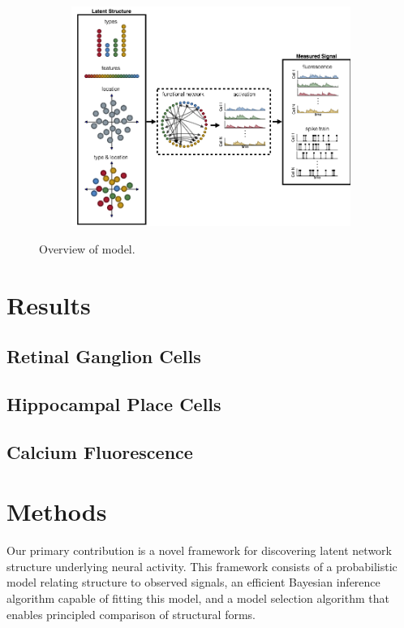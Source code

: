 \begin{figure}[t]
  \centering
  \begin{subfigure}[b]{\textwidth}
    \centering
    \includegraphics[width=\textwidth]{figures/ch3/figure1.png}
  \end{subfigure}
  \caption{Overview of model.}
  \label{fig:fig1}
\end{figure}

\section{Results}

\subsection{Retinal Ganglion Cells}

\subsection{Hippocampal Place Cells}

\subsection{Calcium Fluorescence}

\section{Methods}
Our primary contribution is a novel framework for discovering latent
network structure underlying neural activity.  This framework consists
of a probabilistic model relating structure to observed signals, an
efficient Bayesian inference algorithm capable of fitting this model,
and a model selection algorithm that enables principled comparison of
structural forms.

